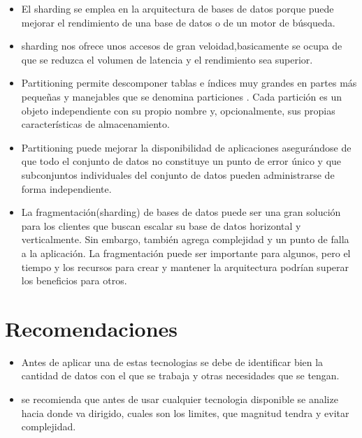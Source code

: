 \documentclass{article}
\begin{document}
\begin{multicols}{2}
\begin{itemize}
    \item El sharding se emplea en la arquitectura de bases de datos porque puede mejorar el rendimiento de una base de datos o de un motor de búsqueda.
    
    \item sharding nos ofrece unos accesos de gran veloidad,basicamente se ocupa de que se reduzca el volumen de latencia y el rendimiento sea superior.
    
    \item Partitioning permite descomponer tablas e índices muy grandes en partes más pequeñas y manejables que se denomina particiones . Cada partición es un objeto independiente con su propio nombre y, opcionalmente, sus propias características de almacenamiento.    
    
    \item Partitioning puede mejorar la disponibilidad de aplicaciones asegurándose de que todo el conjunto de datos no constituye un punto de error único y que subconjuntos individuales del conjunto de datos pueden administrarse de forma independiente.

    \item La fragmentación(sharding) de bases de datos puede ser una gran solución para los clientes que buscan escalar su base de datos horizontal y verticalmente. Sin embargo, también agrega complejidad y un punto de falla a la aplicación. La fragmentación puede ser importante para algunos, pero el tiempo y los recursos para crear y mantener la arquitectura podrían superar los beneficios para otros.
 
    
\end{itemize}
 

\section{Recomendaciones}
\begin{itemize}
    \item  Antes de aplicar una de estas tecnologias se debe de identificar bien la cantidad de datos con el que se trabaja y otras necesidades que se tengan.
    
     \item  se recomienda que antes de usar cualquier tecnologia disponible se analize hacia donde va dirigido, cuales son los limites, que magnitud tendra y evitar complejidad.
    
\end{itemize}
\end{multicols}
\newpage
\end{document}
